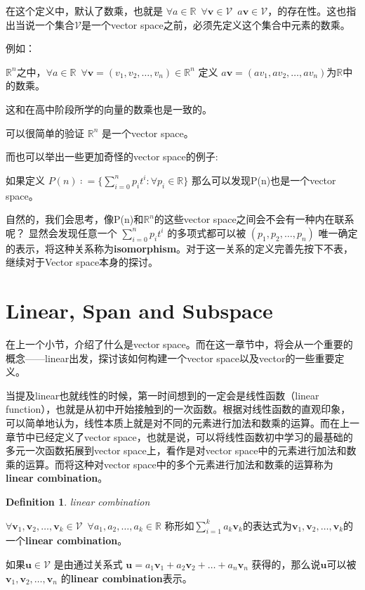 \documentclass{report}
\def\R{\mathbb{R}}
\def\b{\,\,\,}
\def\V{\mathcal{V}}
\def\v{\mathbf{v}}
\def\u{\mathbf{u}}
\newtheorem{definition}{Definition}[chapter]
\newcommand{\deftitle}[1]{\begin{definition}  #1 \end{definition}}
\newcommand{\defb}[1]{\begin{tcolorbox} [colback=orange!20, colframe=orange!60, sharp corners, leftrule={3pt}, rightrule={0pt}, toprule={0pt}, bottomrule={0pt}, left={2pt}, right={2pt}, top={3pt}, bottom={3pt}] \deftitle{#1}}
\def\defe{\end{tcolorbox}}
\def\egb{\begin{tcolorbox} [colback=cyan!20, colframe=cyan!40, sharp corners, leftrule={5pt}, rightrule={0pt}, toprule={0pt}, bottomrule={0pt}, left={2pt}, right={2pt}, top={3pt}, bottom={3pt}]}
\def\ege{\end{tcolorbox}}
\begin{document}
在这个定义中，默认了数乘，也就是 $ \forall a \in \R \b \forall \v \in \V \b a\v \in \V $，的存在性。这也指出当说一个集合$\V$是一个vector space之前，必须先定义这个集合中元素的数乘。

\egb
例如：

$\R^n$之中，$\forall a \in \R \b \forall \v = (v_1,v_2,\dots,v_n) \in \R^n$ 定义 $ a\v = (av_1,av_2,\dots,av_n) $为$\R$中的数乘。

这和在高中阶段所学的向量的数乘也是一致的。
\ege

可以很简单的验证 $ \mathbb{R}^n $ 是一个vector space。

\egb
而也可以举出一些更加奇怪的vector space的例子:

如果定义 $ P(n) ∶=\{ \sum_{i=0}^n p_i t^i :\forall p_i\in \mathbb{R}\} $  那么可以发现P(n)也是一个vector space。
\ege 

自然的，我们会思考，像P(n)和$\mathbb{R}^n$的这些vector space之间会不会有一种内在联系呢？
显然会发现任意一个 $ \sum_{i=0}^n p_i t^i $ 的多项式都可以被 $ (p_1,p_2,…,p_n) $ 唯一确定的表示，将这种关系称为\textbf{isomorphism}。对于这一关系的定义完善先按下不表，继续对于Vector space本身的探讨。

\section{Linear, Span and Subspace}

在上一个小节，介绍了什么是vector space。而在这一章节中，将会从一个重要的概念——linear出发，探讨该如何构建一个vector space以及vector的一些重要定义。

当提及linear也就线性的时候，第一时间想到的一定会是线性函数（linear function），也就是从初中开始接触到的一次函数。根据对线性函数的直观印象，可以简单地认为，线性本质上就是对不同的元素进行加法和数乘的运算。而在上一章节中已经定义了vector space，也就是说，可以将线性函数初中学习的最基础的多元一次函数拓展到vector space上，看作是对vector space中的元素进行加法和数乘的运算。而将这种对vector space中的多个元素进行加法和数乘的运算称为\textbf{linear combination}。

\defb{linear combination}
	$\forall \v_1,\v_2,…,\v_k \in \V \b \forall a_1,a_2,…,a_k \in \R $ 称形如$ \sum_{i=1}^{k} a_k \v_k $的表达式为$\v_1, \v_2 , \dots , \v_k$的一个\textbf{linear combination}。
	
	如果$ \u \in \V$ 是由通过关系式 $\u = a_1\v_1+a_2\v_2+…+a_n\v_n $ 获得的，那么说$\u$可以被$ \v_1,\v_2,…,\v_n $ 的\textbf{linear combination}表示。
	
\defe
\end{document}
